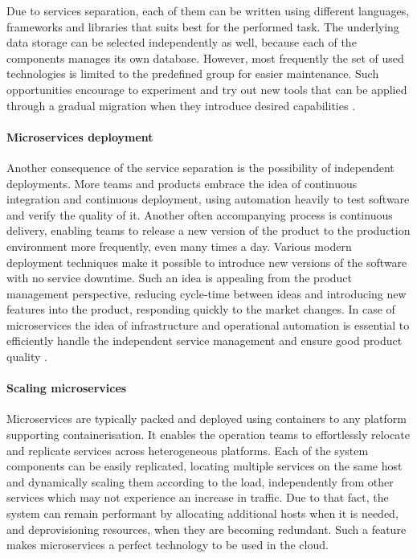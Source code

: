 Due to services separation, each of them can be written using different languages, frameworks and libraries that suits best for the performed task. The underlying data storage can be selected independently as well, because each of the components manages its own database. However, most frequently the set of used technologies is limited to the predefined group for easier maintenance. Such opportunities encourage to experiment and try out new tools that can be applied through a gradual migration when they introduce desired capabilities \cite{FowlerMicroservicesTradeoffs}.

\paragraph{Microservices deployment}

Another consequence of the service separation is the possibility of independent deployments. More teams and products embrace the idea of continuous integration and continuous deployment, using automation heavily to test software and verify the quality of it. Another often accompanying process is continuous delivery, enabling teams to release a new version of the product to the production environment more frequently, even many times a day. Various modern deployment techniques make it possible to introduce new versions of the software with no service downtime. Such an idea is appealing from the product management perspective, reducing cycle-time between ideas and introducing new features into the product, responding quickly to the market changes. In case of microservices the idea of infrastructure and operational automation is essential to efficiently handle the independent service management and ensure good product quality \cite{FowlerMicroservicesTradeoffs}.

\paragraph{Scaling microservices}

Microservices are typically packed and deployed using containers to any platform supporting containerisation. It enables the operation teams to effortlessly relocate and replicate services across heterogeneous platforms. Each of the system components can be easily replicated, locating multiple services on the same host and dynamically scaling them according to the load, independently from other services which may not experience an increase in traffic. Due to that fact, the system can remain performant by allocating additional hosts when it is needed, and deprovisioning resources, when they are becoming redundant. Such a feature makes microservices a perfect technology to be used in the cloud.

